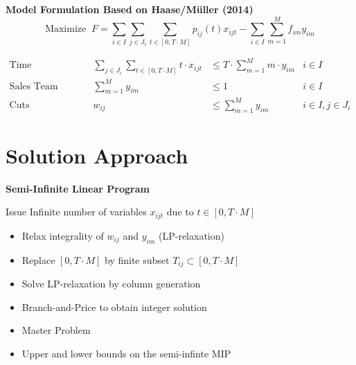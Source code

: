 \documentclass[xcolor=dvipsnames,aspectratio=169, handout, mathserif]{beamer}
\begin{document}
\begin{frame}{\textbf{Model Formulation Based on Haase/Müller (2014)}}
\vspace{-5mm}
\footnotesize
\begin{equation}
 \text{Maximize } \ F =  \sum_{i \in I} \sum_{j \in J_i} \sum_{t \in [0,T \cdot M]} p_{ij}(t)  x_{ijt} - \sum_{i \in I} \sum_{m=1}^M f_{im} y_{im}  \label{sfd-mod-of}
\end{equation}

\begin{align}
\text{Time Allocation} && \sum_{ j \in J_i} \sum_{t\in [0,T \cdot M]} t \cdot x_{ijt} &\leq T \cdot \sum_{m=1}^M m \cdot y_{im}  &i \in I \\
\text{Sales Team Assignment} && \sum_{m=1}^M y_{im} &\le 1 &i \in I \\
\text{Cuts} && w_{ij} &\le  \sum_{m = 1}^M y_{im} &i \in I,  j \in J_i 
\end{align}
\normalsize
{}
\end{frame}


\section{Solution Approach}


\begin{frame}{\textbf{Semi-Infinite Linear Program}}
\begin{block}{Issue}
Infinite number of variables $x_{ijt}$ due to $t \in \left[ 0,T \cdot M \right]$
\end{block}
\bigskip
{}
\begin{itemize}
  \item<2-> Relax integrality of $w_{ij}$ and $y_{im}$ (LP-relaxation)
  \item<3-> Replace $[0,T \cdot M]$ by finite subset $T_{ij} \subset [0,T \cdot M]$  
	\item<4-> Solve LP-relaxation by column generation
	\item<5-> Branch-and-Price to obtain integer solution
\end{itemize}
\vfill
{}
\begin{itemize}
  \item<2->  Master Problem
  \item<5-> Upper and lower bounds on the semi-infinte MIP
\end{itemize}
\end{frame}
\end{document}
